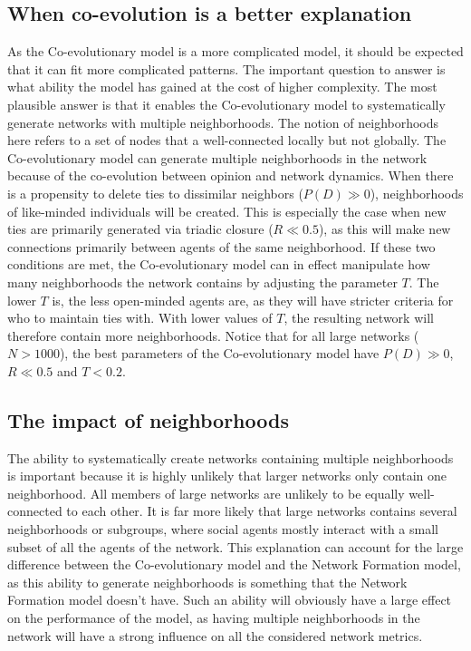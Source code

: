 \documentclass[11pt]{article}
\begin{document}
\subsection{When co-evolution is a better explanation}
As the Co-evolutionary model is a more complicated model, it should be expected that it can fit more complicated patterns. The important question to answer is what ability the model has gained at the cost of higher complexity.
The most plausible answer is that it enables the Co-evolutionary model to systematically generate networks with multiple neighborhoods. The notion of neighborhoods here refers to a set of nodes that a well-connected locally but not globally. The Co-evolutionary model can generate multiple neighborhoods in the network because of the co-evolution between opinion and network dynamics. 
When there is a propensity to delete ties to dissimilar neighbors ($P(D) \gg 0$), neighborhoods of like-minded individuals will be created. This is especially the case when new ties are primarily generated via triadic closure ($R \ll 0.5$), as this will make new connections primarily between agents of the same neighborhood. 
If these two conditions are met, the Co-evolutionary model can in effect manipulate how many neighborhoods the network contains by adjusting the parameter $T$. 
The lower $T$ is, the less open-minded agents are, as they will have stricter criteria for who to maintain ties with. With lower values of $T$, the resulting network will therefore contain more neighborhoods. Notice that for all large networks ($N > 1000$), the best parameters of the Co-evolutionary model have $P(D) \gg 0$, $R \ll 0.5$ and $T < 0.2$.

\subsection{The impact of neighborhoods}
The ability to systematically create networks containing multiple neighborhoods is important because it is highly unlikely that larger networks only contain one neighborhood. All members of large networks are unlikely to be equally well-connected to each other. It is far more likely that large networks contains several neighborhoods or subgroups, where social agents mostly interact with a small subset of all the agents of the network. 
This explanation can account for the large difference between the Co-evolutionary model and the Network Formation model, as this ability to generate neighborhoods is something that the Network Formation model doesn't have. Such an ability will obviously have a large effect on the performance of the model, as having multiple neighborhoods in the network will have a strong influence on all the considered network metrics. 
\end{document}
